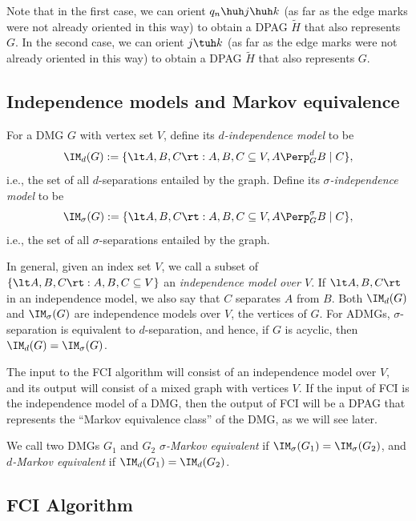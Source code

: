 Note that in the first case, we can orient $q_n \huh j \huh k$ (as far as the edge marks were not already oriented in this way) to obtain a DPAG $\tilde{H}$ that also represents $G$. 
In the second case, we can orient $j \tuh k$ (as far as the edge marks were not already oriented in this way) to obtain a DPAG $\tilde{H}$ that also represents $G$.

\subsection{Independence models and Markov equivalence}

\begin{Def}\label{def:independence_model}
  For a DMG $G$ with vertex set $V$, define its \emph{$d$-independence model} to be
  $$\IM_d(G) := \{ \lt A, B, C \rt : A, B, C \subseteq V, A \Perp_G^d B \mid C \},$$
  i.e., the set of all $d$-separations entailed by the graph. Define its
  \emph{$\sigma$-independence model} to be
  $$\IM_\sigma(G) := \{ \lt A, B, C \rt : A, B, C \subseteq V, A \Perp_G^\sigma B \mid C \},$$
  i.e., the set of all $\sigma$-separations entailed by the graph. 
\end{Def}
In general, given an index set $V$, we call a subset of 
$\{ \lt A, B, C \rt : A, B, C \subseteq V \}$
an \emph{independence model over $V$}.
If $\lt A, B, C \rt$ in an independence model, we also say that $C$ separates $A$ from $B$.
Both $\IM_d(G)$ and $\IM_\sigma(G)$ are independence models over $V$, the vertices of $G$.
For ADMGs, $\sigma$-separation is equivalent to $d$-separation, and hence, if $G$ is acyclic, then
$\IM_d(G) = \IM_\sigma(G)$.

The input to the FCI algorithm will consist of an independence model over $V$,
and its output will consist of a mixed graph with vertices $V$.
If the input of FCI is the independence model of a DMG, then the output of FCI
will be a DPAG that represents the ``Markov equivalence class'' of the DMG, as
we will see later.
\begin{Def}\label{def:Markov_equivalent}
  We call two DMGs $G_1$ and $G_2$ \emph{$\sigma$-Markov equivalent} if $\IM_\sigma(G_1) = \IM_\sigma(G_2)$,
  and \emph{$d$-Markov equivalent} if $\IM_d(G_1) = \IM_d(G_2)$.
\end{Def}

\subsection{FCI Algorithm}

